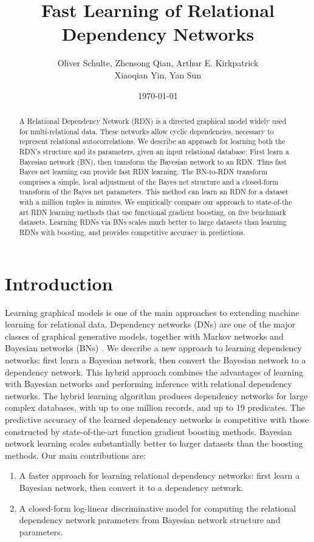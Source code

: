 \documentclass[runningheads,a4paper]{llncs}
\title{Fast Learning of Relational Dependency Networks}
\author{Oliver Schulte, Zhensong Qian, Arthur E. Kirkpatrick\\ Xiaoqian Yin, Yan Sun 
}
\institute{ School of Computing Science, Simon Fraser University, Canada\\
\{oschulte,zqian,ted,xiaoqian\_yin,sunyans\}@sfu.ca\\}
\date{\today}
\begin{document}
\maketitle



\begin{abstract} 
A Relational Dependency Network (RDN) is a directed graphical model widely used for multi-relational data. These networks allow cyclic dependencies, necessary to represent relational autocorrelations. We describe an approach for learning both the RDN's structure and its parameters, given an input relational database: First learn a Bayesian network (BN), then transform the Bayesian network to an RDN. Thus fast Bayes net learning can provide fast RDN learning. The BN-to-RDN transform comprises a simple, local adjustment of the Bayes net structure and a closed-form transform of the Bayes net parameters. This method can learn an RDN for a dataset with a million tuples in minutes. We empirically compare our approach to state-of-the art RDN learning methods that use functional gradient boosting, on five benchmark datasets. Learning RDNs via BNs scales much better to large datasets than learning RDNs with boosting, and provides competitive accuracy in predictions.\end{abstract}


 \section{Introduction} \label{sec:intro} Learning graphical models is one of the main approaches to extending machine learning for relational data. 
Dependency networks (DNs) \cite{Heckerman2000} are one of the major classes of graphical generative models, together with Markov networks and Bayesian networks (BNs) \cite{Pearl1988}. We describe a new approach to learning dependency networks: first learn a Bayesian network, then convert the Bayesian network to a dependency network. 
This hybrid approach combines the advantages of learning with Bayesian networks and performing inference with relational dependency networks. 
The hybrid learning algorithm produces dependency networks for large complex databases, with up to one million records, and up to 19 predicates. The predictive accuracy of the learned dependency networks is competitive with those constructed by state-of-the-art function gradient boosting methods.
Bayesian network learning scales substantially better   to larger datasets than the boosting methods.
%
Our main contributions are:
\begin{enumerate}
\item A faster approach for learning relational dependency networks: first learn a Bayesian network, then convert it to a dependency network.
\item A closed-form log-linear discriminative model for computing the relational dependency network parameters from Bayesian network structure and parameters.
\end{enumerate}
  
\end{document}
